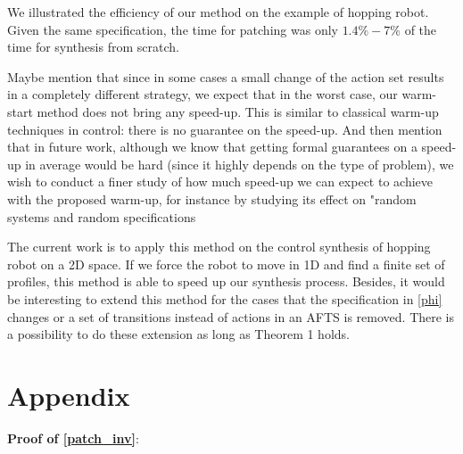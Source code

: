 We illustrated the efficiency of our method on the example of hopping robot. Given the same specification, the time for patching was only $ 1.4\%-7\% $ of the time for synthesis from scratch. 

{\color{purple} Maybe mention that since in some cases a small change of the action set results in a completely different strategy, we expect that in the worst case, our warm-start method does not bring any speed-up. This is similar to classical warm-up techniques in control: there is no guarantee on the speed-up. And then mention that in future work, although we know that getting formal guarantees on a speed-up in average would be hard (since it highly depends on the type of problem), we wish to conduct a finer study of how much speed-up we can expect to achieve with the proposed warm-up, for instance by studying its effect on "random systems and random specifications}

The current work is to apply this method on the control synthesis of hopping robot on a 2D space. If we force the robot to move in 1D and find a finite set of profiles, this method is able to speed up our synthesis process. Besides, it would be interesting to extend this method for the cases that the specification in \eqref{phi} changes or a set of transitions instead of actions in an AFTS is removed. There is a possibility to do these extension as long as Theorem 1 holds.

\iffalse
\section{Appendix}
\textbf{Proof of \eqref{patch_inv}}:

